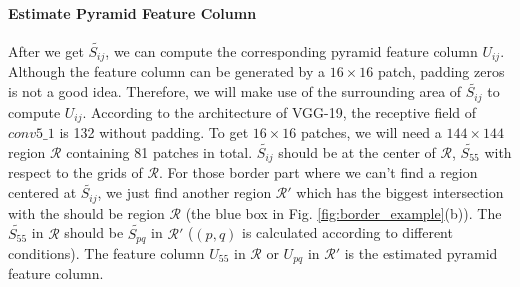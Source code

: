 \documentclass[10pt,twocolumn,letterpaper]{article}
\begin{document}

\paragraph*{Estimate Pyramid Feature Column}
After we get $\tilde{S_{ij}}$, we can compute the corresponding pyramid feature column $U_{ij}$. Although the feature column can be generated by a $16\times16$ patch, padding zeros is not a good idea. Therefore, we will make use of the surrounding area of $\tilde{S_{ij}}$ to compute $U_{ij}$. According to the architecture of VGG-19, the receptive field of $conv5\_1$ is 132 without padding. To get $16\times16$ patches, we will need a $144\times144$ region $\mathcal{R}$ containing 81 patches in total. $\tilde{S_{ij}}$ should be at the center of $\mathcal{R}$, \ie $\tilde{S_{55}}$ with respect to the grids of $\mathcal{R}$. For those border part where we can't find a region centered at $\tilde{S_{ij}}$, we just find another region $\mathcal{R}'$ which has the biggest intersection with the should be region $\mathcal{R}$ (the blue box in Fig. \ref{fig:border_example}(b)). The $\tilde{S_{55}}$ in $\mathcal{R}$  should be $\tilde{S_{pq}}$ in $\mathcal{R}'$ ($(p, q)$ is calculated according to different conditions). The feature column $U_{55}$ in $\mathcal{R}$ or $U_{pq}$ in $\mathcal{R'}$ is the estimated pyramid feature column. 
\end{document}
